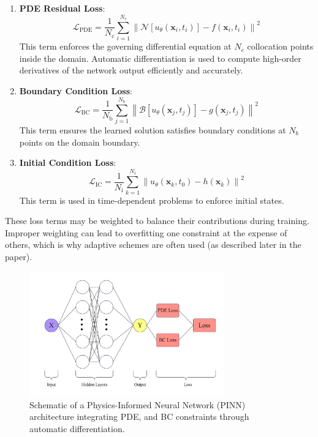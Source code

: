 \documentclass[12pt]{article}
\begin{document}
\begin{enumerate}
    \item \textbf{PDE Residual Loss}:
    \begin{equation}
        \mathcal{L}_{\text{PDE}} = \frac{1}{N_{\text{c}}} \sum_{i=1}^{N_{\text{c}}} 
        \left\| \mathcal{N}[u_\theta(\mathbf{x}_i, t_i)] - f(\mathbf{x}_i, t_i) \right\|^2
        \label{eq:pde_loss}
    \end{equation}
    This term enforces the governing differential equation at $N_c$ collocation points inside the domain. Automatic differentiation is used to compute high-order derivatives of the network output efficiently and accurately.

    \item \textbf{Boundary Condition Loss}:
    \begin{equation}
        \mathcal{L}_{\text{BC}} = \frac{1}{N_{\text{b}}} \sum_{j=1}^{N_{\text{b}}} 
        \left\| \mathcal{B}[u_\theta(\mathbf{x}_j, t_j)] - g(\mathbf{x}_j, t_j) \right\|^2
        \label{eq:bc_loss}
    \end{equation}
    This term ensures the learned solution satisfies boundary conditions at $N_b$ points on the domain boundary.

    \item \textbf{Initial Condition Loss}:
    \begin{equation}
        \mathcal{L}_{\text{IC}} = \frac{1}{N_{\text{i}}} \sum_{k=1}^{N_{\text{i}}} 
        \left\| u_\theta(\mathbf{x}_k, t_0) - h(\mathbf{x}_k) \right\|^2
        \label{eq:ic_loss}
    \end{equation}
    This term is used in time-dependent problems to enforce initial states.
\end{enumerate}

These loss terms may be weighted to balance their contributions during training. Improper weighting can lead to overfitting one constraint at the expense of others, which is why adaptive schemes are often used (as described later in the paper).

\begin{figure}[htbp]
    \centering
    \includegraphics[width=0.75\textwidth]{fig.png}
    \caption{Schematic of a Physics-Informed Neural Network (PINN) architecture integrating PDE, and BC constraints through automatic differentiation.}
    \label{}
\end{figure}
\end{document}
